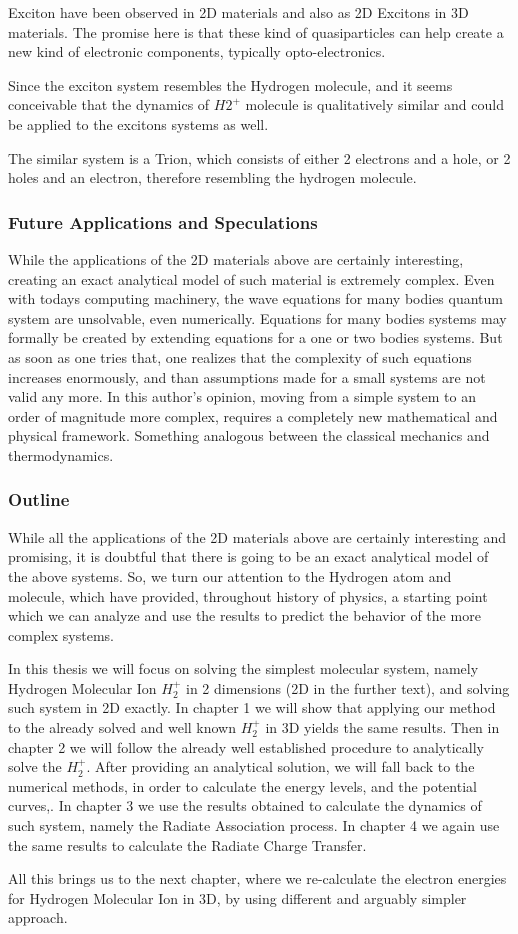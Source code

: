 Exciton have been observed in 2D materials \cite{Excitons2D1, Excitons2D2} and also as 2D Excitons in 3D materials. The promise here is that these kind of quasiparticles can help create a new kind of electronic components, typically opto-electronics.

Since the exciton system resembles the Hydrogen molecule, and it seems conceivable that the dynamics of  $ H2^{+} $ molecule is qualitatively similar and could be applied to the excitons systems as well.

The similar system is a Trion, which consists of either 2 electrons and a hole, or 2 holes and an electron, therefore resembling the hydrogen molecule.

\subsubsection{Future Applications and Speculations}

While the applications of the 2D materials above are certainly interesting, creating an exact analytical  model of such material is extremely complex. Even with todays computing machinery, the wave equations for many bodies quantum system are unsolvable, even numerically.  Equations for many bodies systems may formally be created by extending equations for a one or two bodies systems. But as soon as one tries that, one realizes that the complexity of such equations increases enormously, and than assumptions  made for a small systems are not valid any more. In this author's opinion, moving from a simple system to an order of magnitude more complex, requires a completely new mathematical and physical framework. Something analogous between the classical mechanics and thermodynamics.

\subsubsection{Outline}

While all the applications of the 2D materials above are certainly interesting and promising, it is doubtful that there is going to be an exact analytical model of the above systems. So, we turn our attention to the Hydrogen atom and molecule, which have provided, throughout history of physics, a starting point which we can analyze and use the results to predict the behavior of the more complex systems. 

In this thesis we will focus on solving the simplest molecular system, namely Hydrogen Molecular Ion $ {H_2^{+}}  $ in 2 dimensions (2D in the further text), and solving such system in 2D exactly.  In chapter 1 we will show that applying our method to the already solved and well known $ {H_2^{+}} $ in 3D yields the same results. Then in chapter 2 we will follow  the already well established procedure \cite{Bates1} to analytically solve the $ {H_2^{+}} $. After providing an analytical solution, we will fall back to the numerical methods, in order to calculate the energy levels, and the potential curves,. In chapter 3 we use the results obtained to calculate the dynamics of such system, namely the Radiate Association process. In chapter 4 we again use the same results to calculate the Radiate Charge Transfer. 

All this brings us to the next chapter, where we re-calculate the electron energies for Hydrogen Molecular Ion in 3D, by using different and arguably simpler approach.

